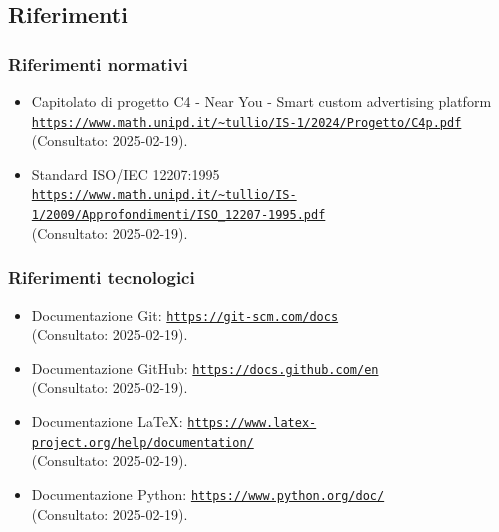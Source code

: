 \documentclass[10pt]{article}
\begin{document}
\begin{justify}
    \subsection{Riferimenti}
        \subsubsection{Riferimenti normativi}
        \begin{itemize}
            \item Capitolato di progetto C4 - Near You - Smart custom advertising platform\\ \textcolor{blue}{\texttt{\url{https://www.math.unipd.it/~tullio/IS-1/2024/Progetto/C4p.pdf}}}\\ 
              (Consultato: 2025-02-19).
            \item Standard ISO/IEC 12207:1995\\ \textcolor{blue}{\texttt{\url{https://www.math.unipd.it/~tullio/IS-1/2009/Approfondimenti/ISO_12207-1995.pdf}}}\\
              (Consultato: 2025-02-19).
        \end{itemize}
        \subsubsection{Riferimenti tecnologici}
        \begin{itemize}
            \item Documentazione Git: \textcolor{blue}{\texttt{\url{https://git-scm.com/docs}}}\\
              (Consultato: 2025-02-19).
            \item Documentazione GitHub: \textcolor{blue}{\texttt{\url{https://docs.github.com/en}}}\\
              (Consultato: 2025-02-19).
            \item Documentazione \LaTeX: \textcolor{blue}{\texttt{\url{https://www.latex-project.org/help/documentation/}}}\\
              (Consultato: 2025-02-19).
            \item Documentazione Python: \textcolor{blue}{\texttt{\url{https://www.python.org/doc/}}}\\
              (Consultato: 2025-02-19).
        \end{itemize}

\end{justify}
\end{document}
